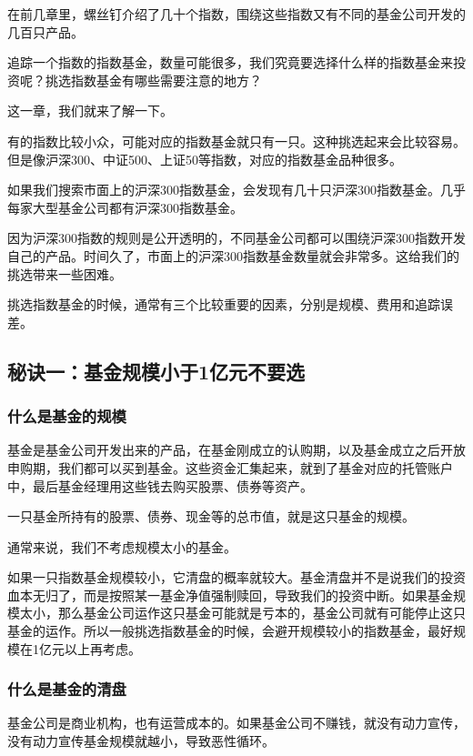 
在前几章里，螺丝钉介绍了几十个指数，围绕这些指数又有不同的基金公司开发的几百只产品。

追踪一个指数的指数基金，数量可能很多，我们究竟要选择什么样的指数基金来投资呢？挑选指数基金有哪些需要注意的地方？

这一章，我们就来了解一下。

有的指数比较小众，可能对应的指数基金就只有一只。这种挑选起来会比较容易。但是像沪深300、中证500、上证50等指数，对应的指数基金品种很多。

如果我们搜索市面上的沪深300指数基金，会发现有几十只沪深300指数基金。几乎每家大型基金公司都有沪深300指数基金。

因为沪深300指数的规则是公开透明的，不同基金公司都可以围绕沪深300指数开发自己的产品。时间久了，市面上的沪深300指数基金数量就会非常多。这给我们的挑选带来一些困难。

挑选指数基金的时候，通常有三个比较重要的因素，分别是规模、费用和追踪误差。

\subsection{秘诀一：基金规模小于1亿元不要选}
\subsubsection{什么是基金的规模}

基金是基金公司开发出来的产品，在基金刚成立的认购期，以及基金成立之后开放申购期，我们都可以买到基金。这些资金汇集起来，就到了基金对应的托管账户中，最后基金经理用这些钱去购买股票、债券等资产。

一只基金所持有的股票、债券、现金等的总市值，就是这只基金的规模。

通常来说，我们不考虑规模太小的基金。

如果一只指数基金规模较小，它清盘的概率就较大。基金清盘并不是说我们的投资血本无归了，而是按照某一基金净值强制赎回，导致我们的投资中断。如果基金规模太小，那么基金公司运作这只基金可能就是亏本的，基金公司就有可能停止这只基金的运作。所以一般挑选指数基金的时候，会避开规模较小的指数基金，最好规模在1亿元以上再考虑。

\subsubsection{什么是基金的清盘}

基金公司是商业机构，也有运营成本的。如果基金公司不赚钱，就没有动力宣传，没有动力宣传基金规模就越小，导致恶性循环。

